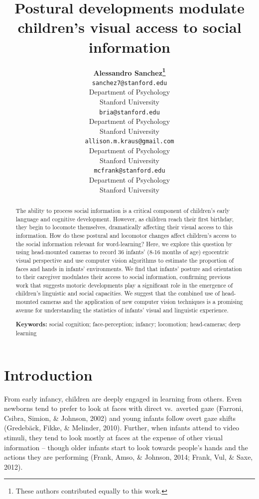 \documentclass[10pt, letterpaper]{article}
\title{Postural developments modulate children's visual access to social
information}
\author{{\large \bf Alessandro Sanchez\thanks{These authors contributed equally to this work.}} \\ \texttt{sanchez7@stanford.edu} \\ Department of Psychology \\ Stanford University \And {\large \bf Bria Long\footnotemark[1]}  \\ \texttt{bria@stanford.edu} \\ Department of Psychology \\ Stanford University \And {\large \bf Allison M. Kraus} \\ \texttt{allison.m.kraus@gmail.com} \\ Department of Psychology \\ Stanford University \And {\large \bf Michael C. Frank} \\ \texttt{mcfrank@stanford.edu} \\ Department of Psychology \\ Stanford University}
\renewcommand*{\thefootnote}{\fnsymbol{footnote}}
\begin{document}
\maketitle

\begin{abstract}
The ability to process social information is a critical component of
children's early language and cognitive development. However, as
children reach their first birthday, they begin to locomote themselves,
dramatically affecting their visual access to this information. How do
these postural and locomotor changes affect children's access to the
social information relevant for word-learning? Here, we explore this
question by using head-mounted cameras to record 36 infants' (8-16
months of age) egocentric visual perspective and use computer vision
algorithms to estimate the proportion of faces and hands in infants'
environments. We find that infants' posture and orientation to their
caregiver modulates their access to social information, confirming
previous work that suggests motoric developments play a significant role
in the emergence of children's linguistic and social capacities. We
suggest that the combined use of head-mounted cameras and the
application of new computer vision techniques is a promising avenue for
understanding the statistics of infants' visual and linguistic
experience.

\textbf{Keywords:}
social cognition; face-perception; infancy; locomotion; head-cameras;
deep learning
\end{abstract}

\newcommand{\wrapmf}[1]{#1}
\renewcommand*{\thefootnote}{\arabic{footnote}}

\setcounter{footnote}{0}

\section{Introduction}\label{introduction}

From early infancy, children are deeply engaged in learning from others.
Even newborns tend to prefer to look at faces with direct vs.~averted
gaze (Farroni, Csibra, Simion, \& Johnson, 2002) and young infants
follow overt gaze shifts (Gredeb\wrapmf{\"{a}}ck, Fikke, \& Melinder,
2010). Further, when infants attend to video stimuli, they tend to look
mostly at faces at the expense of other visual information -- though
older infants start to look towards people's hands and the actions they
are performing (Frank, Amso, \& Johnson, 2014; Frank, Vul, \& Saxe,
2012).
\end{document}
